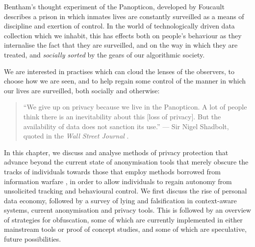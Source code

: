 \documentclass{IOS-Book-Article}     %
\begin{document}


Bentham's thought experiment of the Panopticon, developed by Foucault describes
a prison in which inmates lives are constantly surveilled as a means of
discipline and exertion of control.  In the world of technologically driven data collection which we inhabit, this has effects both on people's behaviour as they internalise the fact that they are surveilled, and on the way in which they are treated, and \emph{socially sorted} by the gears of our algorithmic society\cite{simon2005Panopticism}.

We are interested in practises which can cloud the lenses of the observers, to
choose how we are seen, and to help regain some control of
the manner in which our lives are surveilled, both socially and otherwise:
\begin{quote}``We give up on privacy because we live in the Panopticon. A lot of
people think there is an inevitability about this [loss of privacy]. But the
availability of data does not sanction its use.'' --- Sir Nigel Shadbolt,
quoted in the \emph{Wall Street Journal} \cite{rooney2012OpenData}.\end{quote}

In this chapter, we discuss and analyse methods of privacy protection that
advance beyond the current state of anonymisation tools that merely obscure the tracks
of individuals towards those that employ methods borrowed from
information warfare \cite{gursestranslating,lyon2007surveillance}, in order to allow individuals to regain autonomy
from unsolicited tracking and behavioural control.  We first discuss the rise of 
personal data economy, followed by a survey of lying and falsification in context-aware 
systems, current anonymisation and privacy tools. This is followed by an overview of
strategies for obfuscation, some of which are currently implemented in either
mainstream tools or proof of concept studies,  and some of which are
speculative, future possibilities.
\end{document}
